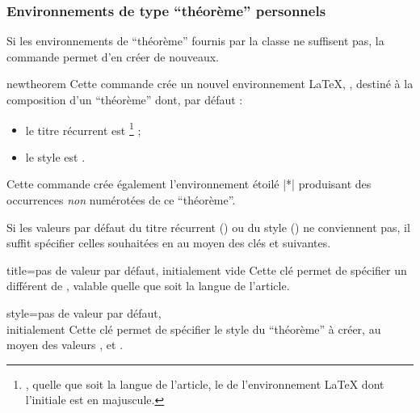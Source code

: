 \subsubsection{Environnements de type \enquote{théorème} personnels}
\label{sec:envir-de-type-1}

Si les environnements de \enquote{théorème} fournis par la classe ne suffisent
pas, la commande  permet d'en créer de nouveaux.

\begin{docCommand}{newtheorem}{}
  Cette commande crée un nouvel environnement \LaTeX{}, , destiné à la
  composition d'un \enquote{théorème} dont, par défaut :
  \begin{itemize}
  \item le titre récurrent est \footnote{\Ie*{}, quelle que soit la
      langue de l'article, le  de l'environnement \LaTeX{} dont
      l'initiale est en majuscule.} ;
  \item le style est .
  \end{itemize}
  Cette commande crée également l'environnement étoilé |*| produisant
  des occurrences \emph{non} numérotées de ce \enquote{théorème}.

  Si les valeurs par défaut du titre récurrent () ou du style
  () ne conviennent pas, il suffit spécifier celles souhaitées
  en  au moyen des clés  et 
  suivantes.
  \begin{docKey}{title}{={}}{pas de
      valeur par défaut, initialement vide}
    Cette clé permet de spécifier un  différent de
    , valable quelle que soit la langue de l'article.
  \end{docKey}
  \begin{docKey}{style}{=\textbar{}\textbar{}}{pas
      de valeur par défaut,\\initialement {}}
    Cette clé permet de spécifier le style du \enquote{théorème} à créer, au
    moyen des valeurs ,  et
    .
  \end{docKey}


\end{docCommand}
